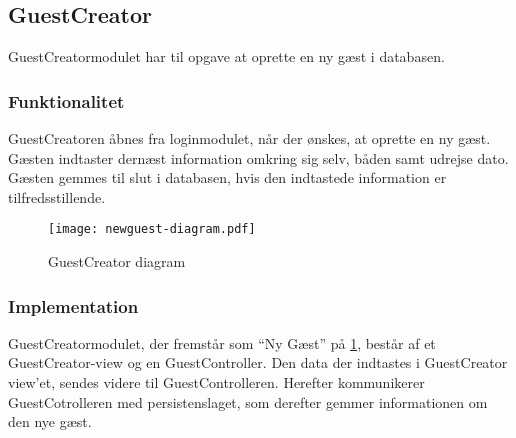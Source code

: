\subsection{GuestCreator}
\label{sub:GuestCreator}

GuestCreatormodulet har til opgave at oprette en ny gæst i databasen.

\subsubsection{Funktionalitet}
\label{ssub:GuestCreator_funktionalitet}
GuestCreatoren åbnes fra loginmodulet, når der ønskes, at oprette en ny gæst. Gæsten indtaster dernæst information omkring sig selv, båden samt udrejse dato. Gæsten gemmes til slut i databasen, hvis den indtastede information er tilfredsstillende.

\begin{figure}
  \centering
  \texttt{[image: newguest-diagram.pdf]}
  \caption{GuestCreator diagram}
  \label{fig:guestcreator}
\end{figure}

\subsubsection{Implementation}
\label{ssub:GuestCreator_implementation}

GuestCreatormodulet, der fremstår som \enquote{Ny Gæst} på \cref{fig:guestcreator}, består af et GuestCreator-view og en GuestController. Den data der indtastes i GuestCreator view'et, sendes videre til GuestControlleren. Herefter kommunikerer GuestCotrolleren med persistenslaget, som derefter gemmer informationen om den nye gæst.